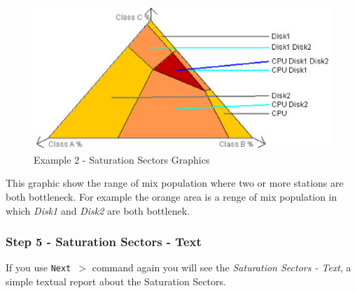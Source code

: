 \begin{figure}[htbp]
    \begin{center}
        \includegraphics[scale=.75]{img/jaba/example2SatSector}
    \end{center}
    \caption{Example 2 - Saturation Sectors Graphics}
    \label{fig:jaba:example2SatSector}
\end{figure}

This graphic show the range of mix population where two or more stations are both bottleneck.
For example the orange area is a renge of mix population in which \textit{Disk1} and \textit{Disk2} are both bottlenek.

\subsubsection{Step 5 - Saturation Sectors - Text}

If you use \texttt{Next $>$} command again you will see the
\textit{Saturation Sectors - Text}, a simple textual report about
the Saturation Sectors.
